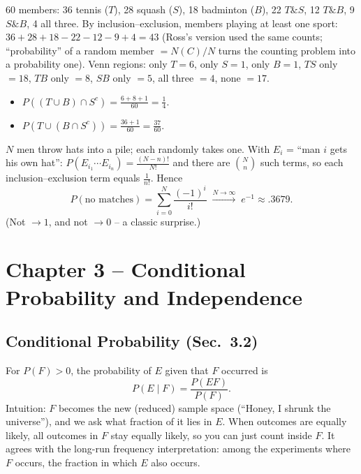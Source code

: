 \documentclass[11pt]{article}
\let\oldsubsection\subsection
\renewcommand{\subsection}{\Needspace{14\baselineskip}\oldsubsection}
\newcommand{\nCr}[2]{\binom{#1}{#2}}
\begin{document}
\begin{exbox}
60 members: 36 tennis ($T$), 28 squash ($S$), 18 badminton ($B$), 22 $T\&S$, 12 $T\&B$, 9 $S\&B$, 4 all three. By inclusion--exclusion, members playing at least one sport: $36+28+18-22-12-9+4=43$ (Ross's version used the same counts; ``probability'' of a random member $=N(C)/N$ turns the counting problem into a probability one).
Venn regions: only $T=6$, only $S=1$, only $B=1$, $TS$ only $=18$, $TB$ only $=8$, $SB$ only $=5$, all three $=4$, none $=17$.
\begin{itemize}
\item $P((T\cup B)\cap S^c)=\frac{6+8+1}{60}=\frac14$.
\item $P(T\cup(B\cap S^c))=\frac{36+1}{60}=\frac{37}{60}$.
\end{itemize}
\end{exbox}

\begin{exbox}
$N$ men throw hats into a pile; each randomly takes one. With $E_i$ = ``man $i$ gets his own hat'': $P(E_{i_1}\cdots E_{i_n})=\frac{(N-n)!}{N!}$ and there are $\nCr Nn$ such terms, so each inclusion--exclusion term equals $\frac1{n!}$. Hence
\[ P(\text{no matches})=\sum_{i=0}^N\frac{(-1)^i}{i!}\;\xrightarrow{N\to\infty}\;e^{-1}\approx.3679. \]
(Not $\to1$, and not $\to0$ -- a classic surprise.)
\end{exbox}

\section{Chapter 3 -- Conditional Probability and Independence}

\subsection{Conditional Probability (Sec.\ 3.2)}

\begin{defbox}
For $P(F)>0$, the probability of $E$ given that $F$ occurred is
\[ P(E\mid F)=\frac{P(EF)}{P(F)}. \]
Intuition: $F$ becomes the new (reduced) sample space (``Honey, I shrunk the universe''), and we ask what fraction of it lies in $E$. When outcomes are equally likely, all outcomes in $F$ stay equally likely, so you can just count inside $F$. It agrees with the long-run frequency interpretation: among the experiments where $F$ occurs, the fraction in which $E$ also occurs.
\end{defbox}
\end{document}
